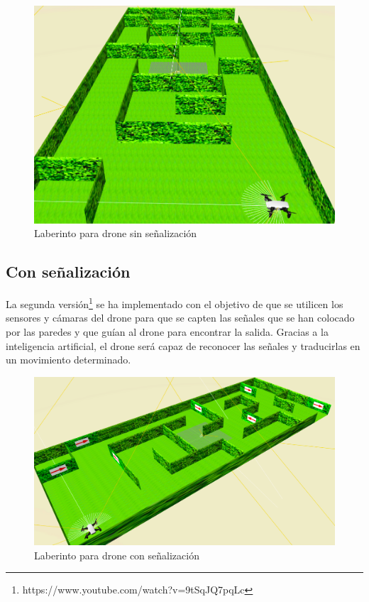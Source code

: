\begin{figure}[h!]
    \centering
    \includegraphics[width=\textwidth, height=0.6\textwidth]{laberinto_drone.png}
    \caption{Laberinto para drone sin señalización}
    \label{fig:Laberinto_drone}
\end{figure}


\subsection{Con señalización}
La segunda versión\footnote{https://www.youtube.com/watch?v=9tSqJQ7pqLc} se ha implementado con el objetivo de que se utilicen los sensores y cámaras del drone para que se capten las señales que se han colocado por las paredes y que guían al drone para encontrar la salida. Gracias a la inteligencia artificial, el drone será capaz de reconocer las señales y traducirlas en un movimiento determinado.

\begin{figure}[h!]
    \centering
    \includegraphics[width=\textwidth, height=0.6\textwidth]{laberinto_drone_flecha.png}
    \caption{Laberinto para drone con señalización}
    \label{fig:Laberinto_drone_señal}
\end{figure}


